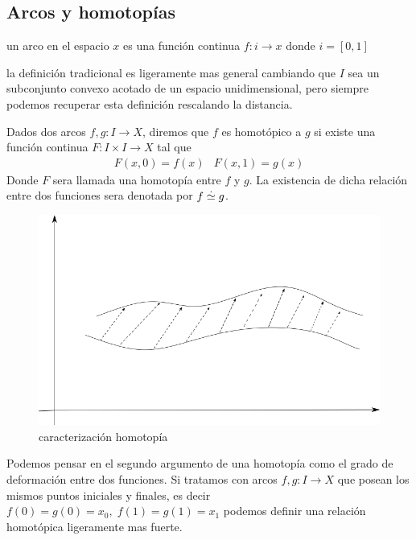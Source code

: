 \subsection{Arcos y homotopías}
\begin{definicion}[arco]
  un arco en el espacio \(x\) es una función continua \(f : i \to x \)
  donde \(i = [0,1]\)
\end{definicion}
la definición tradicional es ligeramente mas general cambiando que \(I\)
sea un subconjunto convexo acotado de un espacio unidimensional, pero
siempre podemos recuperar esta definición rescalando la distancia.

\begin{definicion}[Homotopia]
  Dados dos arcos \(f,g : I \to X\), diremos que \(f\) es homotópico a
  \(g\) si existe una función continua \(F : I \times I \to X \) tal que
  \[ \begin{matrix}
      F (x, 0) = f(x) & F (x, 1) = g(x)
     \end{matrix}
  \]
  Donde \(F\) sera llamada una homotopía entre \(f\) y \(g\). La
  existencia de dicha relación entre dos funciones sera denotada por \(f
  \stackrel{.}{\simeq} g\).
\end{definicion}
\begin{figure}[h]
  \centering
  \includegraphics[scale=0.3]{./imagenes/homotopia.png}
  \caption{caracterización homotopía}
  \label{fig:homotopia-entre-funciones}
\end{figure}
Podemos pensar en el segundo argumento de una homotopía como el grado de
deformación entre dos funciones.
Si tratamos con arcos \(f,g : I \to X\) que posean los mismos puntos
iniciales y finales, es decir \(f(0) = g(0) = x_0, \; f(1) = g(1) =
x_1 \) podemos definir una relación homotópica ligeramente mas fuerte.


